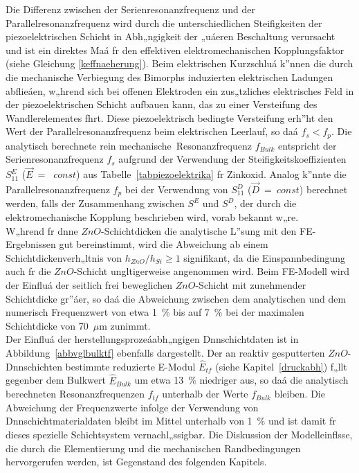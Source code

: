 Die Differenz zwischen der Serienresonanzfrequenz und der
Parallelresonanzfrequenz wird durch die unterschiedlichen Steifigkeiten
der piezoelektrischen Schicht in Abh„ngigkeit der „uáeren Beschaltung
verursacht und ist ein direktes Maá fr den effektiven elektromechanischen
Kopplungsfaktor (siehe Gleichung \ref{keffnaeherung}). Beim elektrischen
Kurzschluá k”nnen die durch die mechanische Verbiegung des Bimorphs
induzierten elektrischen Ladungen ab\-flieáen, w„hrend sich bei offenen
Elektroden ein zus„tzliches
elektrisches Feld in der piezoelektrischen Schicht aufbauen kann, das zu
einer Versteifung des Wandlerelementes fhrt. Diese piezoelektrisch
bedingte Versteifung erh”ht den Wert der Parallelresonanzfrequenz beim
elektrischen Leerlauf, so daá $f_{s} < f_{p}$.
Die analytisch berechnete \glqq rein mechanische\grqq \, Resonanzfrequenz
$f_{Bulk}$ entspricht der Serienresonanzfrequenz $f_{s}$ aufgrund der
Verwendung der Steifigkeitskoeffizienten $S_{11}^{E}$ ($\vec E$~=~ $const$)
aus Tabelle~\ref{tabpiezoelektrika} fr Zinkoxid. Analog k”nnte die
Parallelresonanzfrequenz $f_{p}$ bei der Verwendung von $S_{11}^{D}$
($\vec D$~=~$const$) berechnet werden, falls der Zusammenhang zwischen
$S^{E}$ und $S^{D}$, der durch die elektromechanische Kopplung
beschrieben wird, vorab bekannt w„re.\\
W„hrend fr dnne $ZnO$-Schichtdicken die analytische L”sung mit den
FE-Ergebnissen gut bereinstimmt, wird die Abweichung ab einem
Schichtdickenverh„ltnis von $h_{ZnO}/h_{Si} \ge 1$ signifikant, da die
Einspannbedingung auch fr die $ZnO$-Schicht ungltigerweise angenommen wird.
Beim FE-Modell wird der Einfluá der seitlich frei beweglichen $ZnO$-Schicht
mit zunehmender Schichtdicke gr”áer, so daá die Abweichung zwischen dem
analytischen und dem
numerisch Frequenzwert von etwa 1~\% bis auf 7~\% bei der maximalen
Schichtdicke von 70~$\mu$m zunimmt. \\
%
Der Einfluá der herstellungsprozeáabh„ngigen Dnnschichtdaten ist
in Abbildung~\ref{abbvglbulktf} ebenfalls dargestellt. Der an reaktiv
gesputterten $ZnO$-Dnnschichten \cite{Wag94} bestimmte reduzierte E-Modul
$\hat E_{tf}$ (siehe Kapitel~\ref{druckabh}) f„llt gegenber dem
Bulkwert $\hat E_{Bulk}$ um etwa 13~\% niedriger aus, so daá die
analytisch berechneten Resonanzfrequenzen $f_{tf}$ unterhalb der
Werte $f_{Bulk}$ bleiben. Die Abweichung der Frequenzwerte infolge
der Verwendung von Dnnschichtmaterialdaten bleibt im Mittel unterhalb
von 1~\% und ist damit fr dieses spezielle Schichtsystem vernachl„ssigbar.
Die Diskussion der Modelleinflsse, die durch die Elementierung und die
mechanischen Randbedingungen hervorgerufen werden,
ist Gegenstand des folgenden Kapitels.\\




